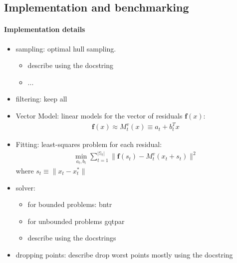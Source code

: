 \subsection{Implementation and benchmarking}

\paragraph{Implementation details}

\begin{itemize}
    \item sampling: optimal hull sampling.
        \begin{itemize}
            \item describe using the docstring
            \item ...
        \end{itemize}
    \item filtering: keep all
    \item Vector Model:  linear models for the vector of residuals $\mathbf{f}(x)$:
    \begin{align}
        \mathbf{f}(x)\approx M^v_{t}(x) \equiv a_t+b_t^Tx
        \label{eq:model-linear}
    \end{align}
    \item Fitting: least-squares problem for each residual:
    \begin{align}
        \min\limits_{a_{t},b_{t}}\sum\limits_{t=1}^{|\mathbb{S}_t|}\lVert\mathbf{f}(s_t)-M_t^v(x_t+s_t)\rVert^2
        \label{eq:fit-linear}
    \end{align}
    where $s_t\equiv\lVert x_t-x_t^*\rVert$
    \item solver:
        \begin{itemize}
            \item for bounded problems: bntr
            \item for unbounded problems gqtpar
            \item describe using the docstrings
        \end{itemize}
    \item  dropping points: describe drop worst points mostly using the docstring
\end{itemize}


